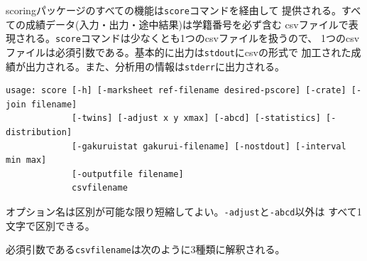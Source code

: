 scoringパッケージのすべての機能は\texttt{score}コマンドを経由して
提供される。すべての成績データ(入力・出力・途中結果)は学籍番号を必ず含む
csvファイルで表現される。\texttt{score}コマンドは少なくとも1つのcsvファイルを扱うので、
1つのcsvファイルは必須引数である。基本的に出力は\texttt{stdout}にcsvの形式で
加工された成績が出力される。また、分析用の情報は\texttt{stderr}に出力される。
\begin{tcolorbox}[enhanced jigsaw,breakable,colframe=\mycolor ,colback=white,colbacktitle=\mycolor ,coltitle=white,fonttitle=\bfseries\sffamily,title=\texttt{\$ score -h}]

\begin{verbatim}
usage: score [-h] [-marksheet ref-filename desired-pscore] [-crate] [-join filename]
             [-twins] [-adjust x y xmax] [-abcd] [-statistics] [-distribution]
             [-gakuruistat gakurui-filename] [-nostdout] [-interval min max]
             [-outputfile filename]
             csvfilename
\end{verbatim}

\end{tcolorbox}
オプション名は区別が可能な限り短縮してよい。\texttt{-adjust}と\texttt{-abcd}以外は
すべて1文字で区別できる。

必須引数である\texttt{csvfilename}は次のように3種類に解釈される。

